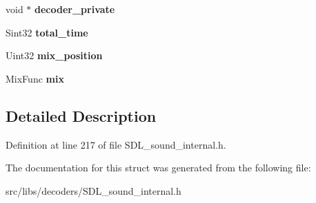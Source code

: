 \begin{DoxyCompactItemize}
\item 
\hypertarget{struct____SOUND__SAMPLEINTERNAL_____a7f77a9e3520eca38b9f0d6aca7a63838}{void $\ast$ {\bfseries decoder\-\_\-private}}\label{struct____SOUND__SAMPLEINTERNAL_____a7f77a9e3520eca38b9f0d6aca7a63838}

\item 
\hypertarget{struct____SOUND__SAMPLEINTERNAL_____a78583a2ffa6911a02e4a59141b060aec}{Sint32 {\bfseries total\-\_\-time}}\label{struct____SOUND__SAMPLEINTERNAL_____a78583a2ffa6911a02e4a59141b060aec}

\item 
\hypertarget{struct____SOUND__SAMPLEINTERNAL_____a3500b2213efdf62093d8addd5fca7de6}{Uint32 {\bfseries mix\-\_\-position}}\label{struct____SOUND__SAMPLEINTERNAL_____a3500b2213efdf62093d8addd5fca7de6}

\item 
\hypertarget{struct____SOUND__SAMPLEINTERNAL_____a1f5ce4527a0ba402b4d1a738c711ce31}{Mix\-Func {\bfseries mix}}\label{struct____SOUND__SAMPLEINTERNAL_____a1f5ce4527a0ba402b4d1a738c711ce31}

\end{DoxyCompactItemize}


\subsection{Detailed Description}


Definition at line 217 of file S\-D\-L\-\_\-sound\-\_\-internal.\-h.



The documentation for this struct was generated from the following file\-:\begin{DoxyCompactItemize}
\item 
src/libs/decoders/S\-D\-L\-\_\-sound\-\_\-internal.\-h\end{DoxyCompactItemize}
